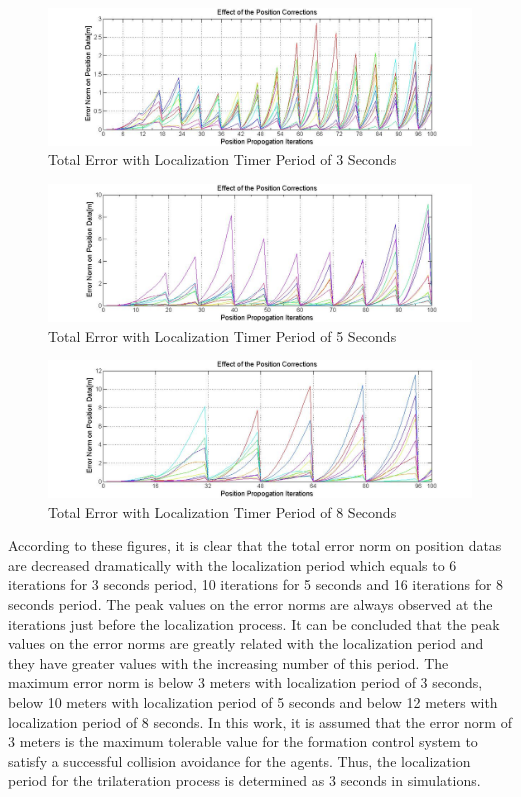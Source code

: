 \begin{figure}[H]
\caption{Total Error with Localization Timer Period of 3 Seconds} \label{3second_period}
\centerline{\includegraphics[scale = 0.4]{Error-0,5Prop-3Update}}
\end{figure} 
		
\begin{figure}[H]
\caption{Total Error with Localization Timer Period of 5 Seconds} \label{5second_period}
\centerline{\includegraphics[scale = 0.4]{Error-0,5Prop-5Update}}
\end{figure} 

\begin{figure}[H]
\caption{Total Error with Localization Timer Period of 8 Seconds} \label{8second_period}
\centerline{\includegraphics[scale = 0.4]{Error-0,5Prop-8Update}}
\end{figure} 		
		
According to these figures, it is clear that the total error norm on position datas are decreased dramatically with the localization period which equals to 6 iterations for 3 seconds period, 10 iterations for 5 seconds and 16 iterations for 8 seconds period. The peak values on the error norms are always observed at the iterations just before the localization process. It can be concluded that the peak values on the error norms are greatly related with the localization period and they have greater values with the increasing number of this period. The maximum error norm is below 3 meters with localization period of 3 seconds, below 10 meters with localization period of 5 seconds and below 12 meters with localization period of 8 seconds. In this work, it is assumed that the error norm of 3 meters is the maximum tolerable value for the formation control system to satisfy a successful collision avoidance for the agents. Thus, the localization period for the trilateration process is determined as 3 seconds in simulations. 

